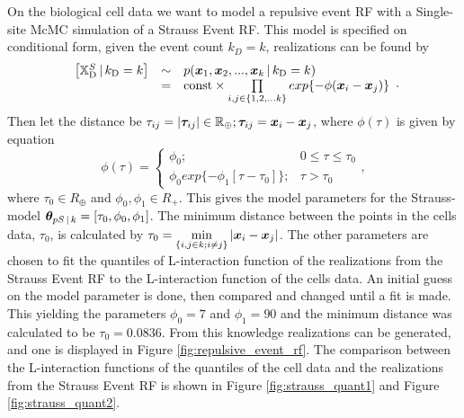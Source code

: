 \section{}
\label{sec:problem4}

On the biological cell data we want to model a repulsive event RF with a Single-site McMC simulation of a Strauss Event RF. This model is specified on conditional form, given the event count $k_D = k$, realizations can be found by
%
\begin{equation}
    \begin{array}{rcl}
        \left[\mathbb{X}_\textrm{D}^S \, | \, k_\textrm{D} = k\right] & \sim & p(\bm{x}_1,\bm{x}_2,...,\bm{x}_k \, | \, k_\textrm{D} = k) \\
         & = & \mathrm{const} \times \prod\limits_{i,j\in \{1,2,...k\}} exp\{-\phi(\bm{x}_i-\bm{x}_j)\}
    \end{array}.
    \label{eq:straureal}
\end{equation}
%
Then let the distance be $\tau_{ij} = |\bm{\tau}_{ij}| \in \mathbb{R}_\oplus; \bm{\tau}_{ij} = \bm{x}_i - \bm{x}_j$, where $\phi(\tau)$ is given by equation 
\begin{equation}
    \phi(\tau) = \begin{cases}
                    \phi_0; & 0 \leq \tau \leq \tau_0\\
                    \phi_0 exp\{-\phi_1[\tau-\tau_0]\}; & \tau > \tau_0
                \end{cases},
    \label{eq:interfunction}
\end{equation}
where $\tau_0 \in R_\oplus$ and $\phi_0,\phi_1 \in R_+$. This gives the model parameters for the Strauss-model $\bm{\theta} _{pS\, | \, k} = [\tau_0,\phi_0,\phi_1]$. The minimum distance between the points in the cells data, $\tau_0$, is calculated by $\tau_0 = \min\limits_{\{i,j\in k;i\neq j\}} |\bm{x}_i-\bm{x}_j|$. The other parameters are chosen to fit the quantiles of L-interaction function of the realizations from the Strauss Event RF to the L-interaction function of the cells data. An initial guess on the model parameter is done, then compared and changed until a fit is made. This yielding the parameters  $\phi_0 = 7$ and $\phi_1 = 90$ and the minimum distance was calculated to be $\tau_0 = 0.0836$. From this knowledge realizations can be generated, and one is displayed in Figure \ref{fig:repulsive_event_rf}. The comparison between the L-interaction functions of the quantiles of the cell data and the realizations from the Strauss Event RF is shown in Figure \ref{fig:strauss_quant1} and  Figure \ref{fig:strauss_quant2}. 
